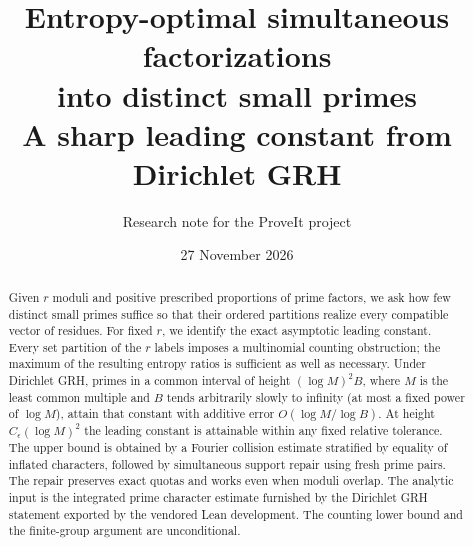 \documentclass[11pt]{article}
\title{Entropy-optimal simultaneous factorizations\texorpdfstring{\\}{ }into distinct small primes\\[4pt]\large A sharp leading constant from Dirichlet GRH}
\author{Research note for the ProveIt project}
\date{27 November 2026}
\theoremstyle{definition}\newtheorem{remark}[theorem]{Remark}
\begin{document}
\maketitle
\begin{abstract}
Given $r$ moduli and positive prescribed proportions of prime factors, we ask how few distinct small primes suffice so that their ordered partitions realize every compatible vector of residues. For fixed $r$, we identify the exact asymptotic leading constant. Every set partition of the $r$ labels imposes a multinomial counting obstruction; the maximum of the resulting entropy ratios is sufficient as well as necessary. Under Dirichlet GRH, primes in a common interval of height $(\log M)^2 B$, where $M$ is the least common multiple and $B$ tends arbitrarily slowly to infinity (at most a fixed power of $\log M$), attain that constant with additive error $O(\log M/\log B)$. At height $C_\epsilon(\log M)^2$ the leading constant is attainable within any fixed relative tolerance. The upper bound is obtained by a Fourier collision estimate stratified by equality of inflated characters, followed by simultaneous support repair using fresh prime pairs. The repair preserves exact quotas and works even when moduli overlap. The analytic input is the integrated prime character estimate furnished by the Dirichlet GRH statement exported by the vendored Lean development. The counting lower bound and the finite-group argument are unconditional.
\end{abstract}
\end{document}

